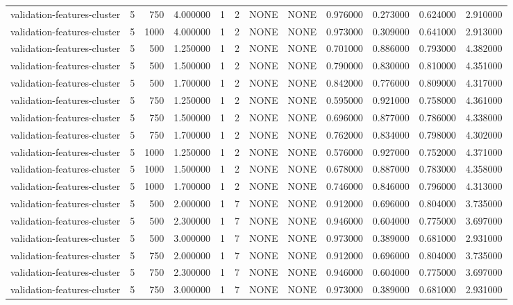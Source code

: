 \begin{tabular}{lrrrllllrrrr}
validation-features-cluster & 5 & 750 & 4.000000 & 1 & 2 & NONE & NONE & 0.976000 & 0.273000 & 0.624000 & 2.910000 \\
validation-features-cluster & 5 & 1000 & 4.000000 & 1 & 2 & NONE & NONE & 0.973000 & 0.309000 & 0.641000 & 2.913000 \\
validation-features-cluster & 5 & 500 & 1.250000 & 1 & 2 & NONE & NONE & 0.701000 & 0.886000 & 0.793000 & 4.382000 \\
validation-features-cluster & 5 & 500 & 1.500000 & 1 & 2 & NONE & NONE & 0.790000 & 0.830000 & 0.810000 & 4.351000 \\
validation-features-cluster & 5 & 500 & 1.700000 & 1 & 2 & NONE & NONE & 0.842000 & 0.776000 & 0.809000 & 4.317000 \\
validation-features-cluster & 5 & 750 & 1.250000 & 1 & 2 & NONE & NONE & 0.595000 & 0.921000 & 0.758000 & 4.361000 \\
validation-features-cluster & 5 & 750 & 1.500000 & 1 & 2 & NONE & NONE & 0.696000 & 0.877000 & 0.786000 & 4.338000 \\
validation-features-cluster & 5 & 750 & 1.700000 & 1 & 2 & NONE & NONE & 0.762000 & 0.834000 & 0.798000 & 4.302000 \\
validation-features-cluster & 5 & 1000 & 1.250000 & 1 & 2 & NONE & NONE & 0.576000 & 0.927000 & 0.752000 & 4.371000 \\
validation-features-cluster & 5 & 1000 & 1.500000 & 1 & 2 & NONE & NONE & 0.678000 & 0.887000 & 0.783000 & 4.358000 \\
validation-features-cluster & 5 & 1000 & 1.700000 & 1 & 2 & NONE & NONE & 0.746000 & 0.846000 & 0.796000 & 4.313000 \\
validation-features-cluster & 5 & 500 & 2.000000 & 1 & 7 & NONE & NONE & 0.912000 & 0.696000 & 0.804000 & 3.735000 \\
validation-features-cluster & 5 & 500 & 2.300000 & 1 & 7 & NONE & NONE & 0.946000 & 0.604000 & 0.775000 & 3.697000 \\
validation-features-cluster & 5 & 500 & 3.000000 & 1 & 7 & NONE & NONE & 0.973000 & 0.389000 & 0.681000 & 2.931000 \\
validation-features-cluster & 5 & 750 & 2.000000 & 1 & 7 & NONE & NONE & 0.912000 & 0.696000 & 0.804000 & 3.735000 \\
validation-features-cluster & 5 & 750 & 2.300000 & 1 & 7 & NONE & NONE & 0.946000 & 0.604000 & 0.775000 & 3.697000 \\
validation-features-cluster & 5 & 750 & 3.000000 & 1 & 7 & NONE & NONE & 0.973000 & 0.389000 & 0.681000 & 2.931000 \\

\end{tabular}
